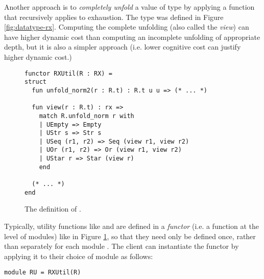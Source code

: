 Another approach is to \emph{completely unfold} a value of type  by applying a function  that recursively applies  to exhaustion. The type  was defined in Figure \ref{fig:datatype-rx}.  Computing the complete unfolding (also called the \emph{view}) can have higher dynamic cost than computing an incomplete unfolding of appropriate depth, but it is also a simpler approach (i.e.   lower cognitive cost can justify higher dynamic cost.)


\begin{figure}[t]
\begin{lstlisting}[numbers=none]
functor RXUtil(R : RX) = 
struct
  fun unfold_norm2(r : R.t) : R.t u u => (* ... *)

  fun view(r : R.t) : rx => 
    match R.unfold_norm r with 
    | UEmpty => Empty
    | UStr s => Str s
    | USeq (r1, r2) => Seq (view r1, view r2)
    | UOr (r1, r2) => Or (view r1, view r2)
    | UStar r => Star (view r)
    end 

  (* ... *)
end
\end{lstlisting}
\vspace{-5px}
\caption{The definition of .}
\vspace{-5px}
\label{fig:RXUtil}
\end{figure}
Typically, utility functions like  and  are defined in a \emph{functor} (i.e. a function at the level of modules) like  in Figure \ref{fig:RXUtil}, so that they need only be defined once, rather than separately for each module . The client can instantiate the functor by applying it to their choice of module as follows:
\begin{lstlisting}[numbers=none]
module RU = RXUtil(R)
\end{lstlisting}
